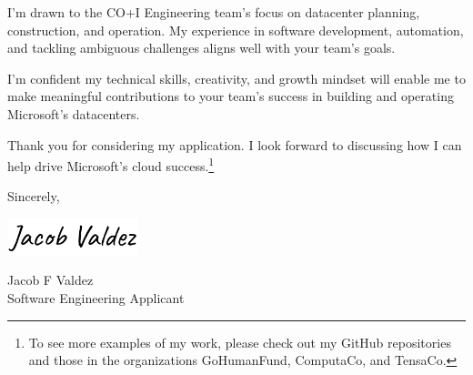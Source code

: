 \documentclass[12pt]{letter}
\newcommand{\myname}{Jacob F Valdez}
\newcommand{\mytitle}{Software Engineering Applicant}
\newcommand{\closer}{Sincerely}
\begin{document}
I'm drawn to the CO+I Engineering team's focus on datacenter planning, construction, and operation. My experience in software development, automation, and tackling ambiguous challenges aligns well with your team's goals.

I'm confident my technical skills, creativity, and growth mindset will enable me to make meaningful contributions to your team's success in building and operating Microsoft's datacenters.

Thank you for considering my application. I look forward to discussing how I can help drive Microsoft's cloud success.\footnote{To see more examples of my work, please check out my GitHub repositories and those in the organizations GoHumanFund, ComputaCo, and TensaCo.}

\vspace{0.1in}
\vfill

\begin{flushright}
    \closer,

    \vspace{-0.1in}\includegraphics[width=1.5in]{sig.png}\vspace{-0.1in}

    \myname\\
    \mytitle
\end{flushright}
\vspace{0.1in}
\end{document}
